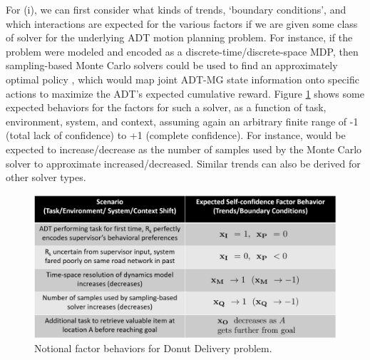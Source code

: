 For (i), we can first consider what kinds of trends, `boundary conditions', and which interactions are expected for the various factors if we are given some class of solver for the underlying ADT motion planning problem. For instance, if the problem were modeled and encoded as a discrete-time/discrete-space MDP, then sampling-based Monte Carlo solvers could be used to find an approximately optimal policy \policyopt{} \cite{Browne2012-fo}, which would map joint ADT-MG state information onto specific actions to maximize the ADT's expected cumulative reward. Figure \ref{fig:trendsBCs} shows some expected behaviors for the \famsec{} factors for such a solver, as a function of task, environment, system, and context, assuming again an arbitrary finite range of -1 (total lack of confidence) to +1 (complete confidence). For instance, \xQ{} would be expected to increase/decrease as the number of samples used by the Monte Carlo solver to approximate \policyopt{} increased/decreased. Similar trends can also be derived for other solver types.  %
\begin{figure}[tbp]
    \centering
    \includegraphics[width=0.65\linewidth]{Figures/scTrendsBoundaryExample_2generic.png}
    \caption{Notional \famsec{} factor behaviors for Donut Delivery problem.}
    \label{fig:trendsBCs}
\end{figure}

